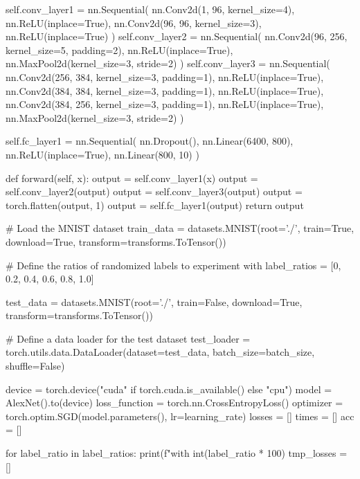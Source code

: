\documentclass[10pt]{article}
\begin{document}
\begin{python}
            self.conv_layer1 = nn.Sequential(
                nn.Conv2d(1, 96, kernel_size=4),
                nn.ReLU(inplace=True),
                nn.Conv2d(96, 96, kernel_size=3),
                nn.ReLU(inplace=True)
            )
            self.conv_layer2 = nn.Sequential(
                nn.Conv2d(96, 256, kernel_size=5, padding=2),
                nn.ReLU(inplace=True),
                nn.MaxPool2d(kernel_size=3, stride=2)
            )
            self.conv_layer3 = nn.Sequential(
                nn.Conv2d(256, 384, kernel_size=3, padding=1),
                nn.ReLU(inplace=True),
                nn.Conv2d(384, 384, kernel_size=3, padding=1),
                nn.ReLU(inplace=True),
                nn.Conv2d(384, 256, kernel_size=3, padding=1),
                nn.ReLU(inplace=True),
                nn.MaxPool2d(kernel_size=3, stride=2)
            )
    
            self.fc_layer1 = nn.Sequential(
                nn.Dropout(),
                nn.Linear(6400, 800),
                nn.ReLU(inplace=True),
                nn.Linear(800, 10)
            )
    
        def forward(self, x):
            output = self.conv_layer1(x)
            output = self.conv_layer2(output)
            output = self.conv_layer3(output)
            output = torch.flatten(output, 1)
            output = self.fc_layer1(output)
            return output
    
    # Load the MNIST dataset
    train_data = datasets.MNIST(root='./', train=True, download=True, transform=transforms.ToTensor())
    
    # Define the ratios of randomized labels to experiment with
    label_ratios = [0, 0.2, 0.4, 0.6, 0.8, 1.0]
    
    test_data = datasets.MNIST(root='./', train=False, download=True, transform=transforms.ToTensor())
    
    # Define a data loader for the test dataset
    test_loader = torch.utils.data.DataLoader(dataset=test_data, batch_size=batch_size, shuffle=False)
    
    
    device = torch.device("cuda" if torch.cuda.is_available() else "cpu")
    model = AlexNet().to(device)
    loss_function = torch.nn.CrossEntropyLoss()
    optimizer = torch.optim.SGD(model.parameters(), lr=learning_rate)
    losses = []
    times = []
    acc = []
    
    for label_ratio in label_ratios:
        print(f"\nExperiment with {int(label_ratio * 100)}%
        tmp_losses = []
    

\end{python}
\end{document}

